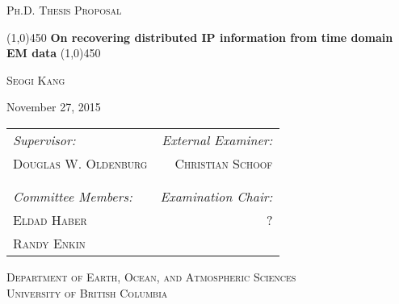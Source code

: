 \begin{titlepage}
 
\begin{center}
\textsc{Ph.D. Thesis Proposal}
\end{center}

\vspace{1cm}
 
\large
\begin{center}
\line(1,0){450}
\vspace{0.25cm}
\textbf{\LARGE On recovering distributed IP information from time domain EM data}
\line(1,0){450}
\end{center}

\normalsize

\vspace{1cm}

\begin{center}
\textsc{\large Seogi Kang}
\end{center}

\begin{center}
\begin{footnotesize}
November 27, 2015
\end{footnotesize}
\end{center}

\vspace{2cm}

\begin{center}
\begin{tabular}{l r}
\textit{Supervisor:} \hspace{8cm} & \textit{External Examiner:} \\
\textsc{Douglas W. Oldenburg} & \textsc{Christian Schoof} \\
 & \\
 & \\
\textit{Committee Members:} & \textit{Examination Chair:}\\
\textsc{Eldad Haber} & \textsc{?}\\
\textsc{Randy Enkin} & \\
\end{tabular}
\end{center}

\vspace{2cm}

\begin{center}
\textsc{Department of Earth, Ocean, and Atmospheric Sciences}\\
\textsc{University of British Columbia}\\
\end{center}

\end{titlepage}